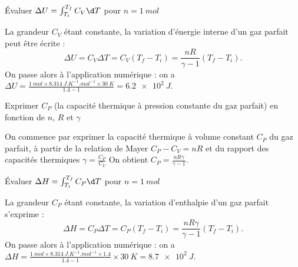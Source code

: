\begin{enonce}
Évaluer $\Delta U = \int_{T_i}^{T_f} C_V \d T$ pour $n=\SI{1}{mol}$ 
\end{enonce}


\begin{corrige}
La grandeur $C_V$ étant constante, la variation d'énergie interne d'un gaz parfait peut être écrite : \minusSmallskip
\[
\Delta U = C_V \Delta T = C_V (T_f - T_i) = \frac{nR}{\gamma - 1} (T_f - T_i).
\]
On passe alors à l'application numérique : on a
 $ \Delta U = \frac{\SI{1}{mol} \times \SI{8,314}{J.K^{-1}.mol^{-1}} \times \SI{30}{K} } {\num{1,4}-1}=\SI{6,2 e2}{J}$.
\end{corrige}




\begin{enonce}
Exprimer $C_P$ (la capacité thermique à pression constante  du gaz parfait) en fonction de $n$, $R$ et $\gamma$

\end{enonce}


\begin{corrige}
On commence par exprimer la capacité thermique à volume constant $C_P$ du gaz parfait, à partir de la relation de Mayer $C_P-C_V=nR$ et du rapport des capacités thermiques $\gamma=\frac{C_P}{C_V}$
On obtient $C_P=\frac{nR\gamma}{\gamma - 1}$.
\end{corrige}



\begin{enonce}
	Évaluer $\Delta H = \int_{T_i}^{T_f} C_P \d T$ pour $n=\SI{1}{mol}$ 
\end{enonce}


\begin{corrige}
La grandeur $C_P$ étant constante, la variation d'enthalpie d'un gaz parfait s'exprime : \minusSmallskip
\[
 \Delta H = C_P \Delta T = C_P (T_f - T_i) = \frac{nR \gamma}{\gamma - 1} (T_f - T_i).
\]
On passe alors à l'application numérique : on a $\Delta H =\frac{\SI{1}{mol} \times \SI{8,314}{J.K^{-1}.mol^{-1}} \times \num{1,4}  } {\num{1,4}-1} \times \SI{30}{K}= \SI{ 8,7e2}{J}$.
\end{corrige}

